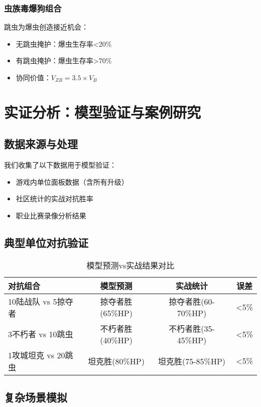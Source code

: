 \documentclass[a4paper,12pt]{article}
\begin{document}
\subsubsection{虫族毒爆狗组合}
跳虫为爆虫创造接近机会：
\begin{itemize}
\item 无跳虫掩护：爆虫生存率<20\%
\item 有跳虫掩护：爆虫生存率>70\%
\item 协同价值：$V_{ZB} = 3.5 \times V_{B}$
\end{itemize}

\section{实证分析：模型验证与案例研究}

\subsection{数据来源与处理}
我们收集了以下数据用于模型验证：
\begin{itemize}
\item 游戏内单位面板数据（含所有升级）
\item 社区统计的实战对抗胜率
\item 职业比赛录像分析结果
\end{itemize}

\subsection{典型单位对抗验证}

\begin{table}[h]
\centering
\caption{模型预测vs实战结果对比}
\begin{tabular}{lccc}
\toprule
\textbf{对抗组合} & \textbf{模型预测} & \textbf{实战统计} & \textbf{误差} \\
\midrule
10陆战队 vs 5掠夺者 & 掠夺者胜(65\%HP) & 掠夺者胜(60-70\%HP) & <5\% \\
3不朽者 vs 10跳虫 & 不朽者胜(40\%HP) & 不朽者胜(35-45\%HP) & <5\% \\
1攻城坦克 vs 20跳虫 & 坦克胜(80\%HP) & 坦克胜(75-85\%HP) & <5\% \\
\bottomrule
\end{tabular}
\end{table}

\subsection{复杂场景模拟}
\end{document}
